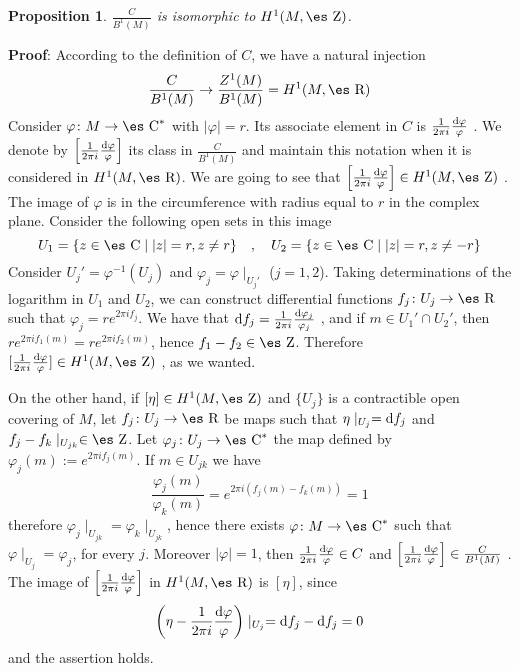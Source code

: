 \documentclass[12pt]{article}
\theoremstyle{plain}
\newtheorem{prop}{Proposition}
\def\dst{\(}
\def\qed{\ifvmode\removelastskip\fi
{\unskip\nobreak\hfil\penalty50\hbox{}\nobreak\hfil
\hbox{\vrule height1.2ex width1.2ex}\parfillskip=0pt
\finalhyphendemerits=0 \par\smallskip}}
\def\d{{\rm d}}
\def\Zahl{\mbox{\es Z}}
\def\Real{\mbox{\es R}}
\def\Complex{\mbox{\es C}}
\begin{document}
\begin{prop}
\dst\frac{C}{B^1(M)}\) is isomorphic to $H^1(M,\Zahl )$.
\end{prop}
{\bf Proof}: 
According to the definition of $C$, we have a natural injection
$$
\frac{C}{B^1(M)} \to \frac{Z^1(M)}{B^1(M)} = H^1(M,\Real )
$$
Consider $\varphi \colon M \to \Complex^*$ with $| \varphi | = r$.
Its associate element in $C$ is \dst\frac{1}{2\pi i}\frac{\d
\varphi}{\varphi}\) .
We denote by \dst\left[\frac{1}{2\pi i}\frac{\d
\varphi}{\varphi}\right]\)
its class in $\frac{C}{B^1(M)}$
and maintain this notation when it is considered in $H^1(M,\Real )$.
We are going to see that
\dst\left[\frac{1}{2\pi i}\frac{\d \varphi}{\varphi}\right] \in
H^1(M,\Zahl )\) .
The image of $\varphi$ is in the circumference
with radius equal to $r$ in the complex plane.
Consider the following open sets in this image
$$
U_1 = \{z \in \Complex \mid |z| = r , z \not= r \}
\quad , \quad
U_2 = \{z \in \Complex \mid |z| = r , z \not= -r \}
$$
Consider $U_j' =\varphi^{-1}(U_j)$
and
$\varphi_j = \varphi \mid_{U_j'}$ ($j=1,2$).
Taking determinations of the logarithm in $U_1$ and $U_2$,
we can construct differential functions $f_j \colon U_j \to \Real$
such that $\varphi _j = re^{2\pi i f_j}$.
We have that \dst\d f_j =\frac{1}{2\pi i}\frac{\d
\varphi_j}{\varphi_j}\) ,
and if $m \in U_1' \cap U_2'$, then
$re^{2\pi if_1(m)} = re^{2\pi if_2(m)}$, hence $f_1-f_2 \in \Zahl$.
Therefore \dst[\frac{1}{2\pi i}\frac{\d \varphi}{\varphi}] \in
H^1(M,\Zahl )\) ,
as we wanted.

On the other hand, if $[\eta ] \in H^1(M,\Zahl )$
and $\{ U_j \}$ is a contractible open covering of $M$,
let $f_j \colon U_j \to \Real$ be maps such that
$\eta \mid_{U_j} = \d f_j$ and $f_j-f_k \mid_{U_{jk}} \in \Zahl$.
Let $\varphi_j \colon U_j \to \Complex^*$
the map defined by $\varphi_j(m) := e^{2\pi if_j(m)}$.
If $m \in U_{jk}$ we have
$$
\frac{\varphi_j(m)}{\varphi_k(m)} = e^{2\pi i(f_j(m)-f_k(m))} = 1
$$
therefore $\varphi_j\mid_{U_{jk}} = \varphi_k\mid_{U_{jk}}$,
hence there exists $\varphi \colon M \to \Complex^*$
such that $\varphi \mid_{U_j} = \varphi_j$, for every $j$.
Moreover $|\varphi | = 1$, then
\dst\frac{1}{2\pi i}\frac{\d \varphi}{\varphi} \in C\) and
\dst\left[\frac{1}{2\pi i}\frac{\d \varphi}{\varphi}\right] \in
\frac{C}{B^1(M)}\) .
The image of
\dst\left[\frac{1}{2\pi i}\frac{\d \varphi}{\varphi}\right]\) in
$H^1(M,\Real )$
is $[\eta ]$, since
$$
\biggl( \eta - \frac{1}{2\pi i}\frac{\d \varphi}{\varphi} \biggr)
\mid_{U_j} = \d f_j - \d f_j = 0
$$
and the assertion holds.
\qed
\end{document}
